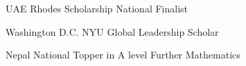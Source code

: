 {%
	UAE}
{%
	Rhodes Scholarship National Finalist}
{}

{%
	Washington D.C.}
{%
	NYU Global Leadership Scholar}
{}

{%
	Nepal}
{%
	National Topper in A level Further Mathematics}
{}
